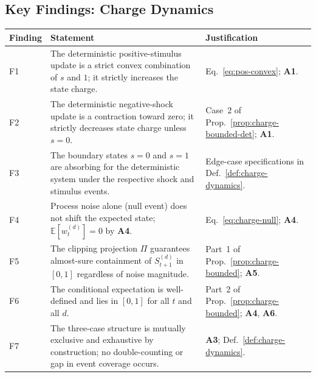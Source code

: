 \documentclass[12pt,openany]{book}
\numberwithin{equation}{chapter}
\theoremstyle{plain}
\theoremstyle{definition}
\theoremstyle{remark}
\def\mathcal#1{#1}%
\begin{document}
\subsection{Key Findings: Charge Dynamics}
\label{subsec:charge-key-findings}

\begin{center}
\begin{tabularx}{\textwidth}{@{} l X X @{}}
\toprule
\textbf{Finding} & \textbf{Statement} & \textbf{Justification} \\
\midrule
F1 & The deterministic positive-stimulus update is a strict
     convex combination of $s$ and $1$; it strictly increases
     the state charge.
   & Eq.~\eqref{eq:pos-convex}; \textbf{A1}. \\[4pt]
F2 & The deterministic negative-shock update is a contraction
     toward zero; it strictly decreases state charge unless
     $s = 0$.
   & Case~2 of Prop.~\ref{prop:charge-bounded-det}; \textbf{A1}. \\[4pt]
F3 & The boundary states $s = 0$ and $s = 1$ are absorbing
     for the deterministic system under the respective shock
     and stimulus events.
   & Edge-case specifications in
     Def.~\ref{def:charge-dynamics}. \\[4pt]
F4 & Process noise alone (null event) does not shift the
     expected state; $\mathbb{E}[w_t^{(d)}] = 0$ by \textbf{A4}.
   & Eq.~\eqref{eq:charge-null}; \textbf{A4}. \\[4pt]
F5 & The clipping projection $\Pi$ guarantees almost-sure
     containment of $\mathcal{S}_{t+1}^{(d)}$ in $[0,1]$
     regardless of noise magnitude.
   & Part~1 of Prop.~\ref{prop:charge-bounded}; \textbf{A5}. \\[4pt]
F6 & The conditional expectation is well-defined and lies in
     $[0,1]$ for all $t$ and all $d$.
   & Part~2 of Prop.~\ref{prop:charge-bounded};
     \textbf{A4}, \textbf{A6}. \\[4pt]
F7 & The three-case structure is mutually exclusive and
     exhaustive by construction; no double-counting or
     gap in event coverage occurs.
   & \textbf{A3}; Def.~\ref{def:charge-dynamics}. \\
\bottomrule
\end{tabularx}
\end{center}
\end{document}
